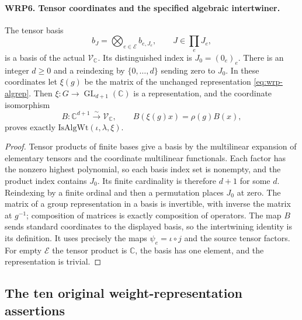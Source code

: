 \documentclass[11pt,a4paper]{article}
\numberwithin{equation}{section}
\theoremstyle{remark}\newtheorem{remark}[theorem]{Remark}
\begin{document}
\paragraph{WRP6. Tensor coordinates and the specified algebraic intertwiner.}
\label{claim:WRP6}
The tensor basis
\[
                 b_J=\bigotimes_{e\in\mathcal E}b_{e,\allowbreak{} J_e},
                   \qquad J\in\prod_e J_e,
\]
is a basis of the actual $\mathcal V_{\mathbb C}$.  Its
distinguished index is $J_0=(0_e)_e$.  There is an integer
$d\geq0$ and a reindexing by $\{0,\ldots,\allowbreak{} d\}$ sending
zero to $J_0$.  In these coordinates let $\xi(g)$ be the
matrix of the unchanged representation \eqref{eq:wrp-algrep}.
Then $\xi:G\to\operatorname{GL}_{d+1}(\mathbb C)$ is a
representation, and the coordinate isomorphism
\begin{equation}\label{eq:wrp-intertwiner}
 B:\mathbb C^{d+1}\xrightarrow{\sim}\mathcal V_{\mathbb C},
              \qquad B(\xi(g)x)=\rho(g)B(x),
\end{equation}
proves exactly $\mathrm{IsAlgWt}(\iota,\lambda,\xi)$.
\begin{proof}
Tensor products of finite bases give a basis by the
multilinear expansion of elementary tensors and the
coordinate multilinear functionals.  Each factor has the
nonzero highest polynomial, so each basis index set is
nonempty, and the product index contains $J_0$.  Its finite
cardinality is therefore $d+1$ for some $d$.  Reindexing by
a finite ordinal and then a permutation places $J_0$ at
zero.  The matrix of a group representation in a basis is
invertible, with inverse the matrix at $g^{-1}$; composition
of matrices is exactly composition of operators.
The map $B$ sends standard coordinates to the displayed
basis, so the intertwining identity is its definition.
It uses precisely the maps $\psi_e=\iota\circ j$ and the
source tensor factors.  For empty $\mathcal E$ the tensor
product is $\mathbb C$, the basis has one element, and the
representation is trivial.
\end{proof}

\subsection{The ten original weight-representation assertions}

\end{document}
